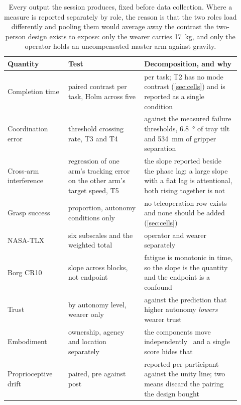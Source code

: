 \begin{table}[htbp]
  \centering
  \small
  \caption[The reporting plan]{Every output the session produces, fixed
  before data collection. Where a measure is reported separately by role,
  the reason is that the two roles load differently and pooling them would
  average away the contrast the two-person design exists to expose: only the
  wearer carries \SI{17}{\kilo\gram}, and only the operator holds an
  uncompensated master arm against gravity.}
  \label{tab:reporting-plan}
  \begin{tabular}{@{}p{0.24\linewidth}p{0.30\linewidth}p{0.38\linewidth}@{}}
    \toprule
    Quantity & Test & Decomposition, and why \\
    \midrule
    Completion time
      & paired contrast per task, Holm across five
      & per task; T2 has no mode contrast (\cref{sec:cells}) and is reported
        as a single condition \\
    Coordination error
      & threshold crossing rate, T3 and T4
      & against the measured failure thresholds, \SI{6.8}{\degree} of tray
        tilt and \SI{534}{\milli\metre} of gripper separation \\
    Cross-arm interference
      & regression of one arm's tracking error on the other arm's target
        speed, T5
      & the slope reported beside the phase lag: a large slope with a flat
        lag is attentional, both rising together is not \\
    Grasp success
      & proportion, autonomy conditions only
      & no teleoperation row exists and none should be added
        (\cref{sec:cells}) \\
    NASA-TLX~\cite{hart1988nasatlx}
      & six subscales and the weighted total
      & operator and wearer separately \\
    Borg CR10~\cite{borg1982perceived}
      & slope across blocks, not endpoint
      & fatigue is monotonic in time, so the slope is the quantity and the
        endpoint is a confound \\
    Trust
      & by autonomy level, wearer only
      & against the prediction that higher autonomy \emph{lowers} wearer
        trust~\cite{zhou2026proxemics} \\
    Embodiment
      & ownership, agency and location separately
      & the components move independently~\cite{longo2008embodiment} and a
        single score hides that \\
    Proprioceptive drift
      & paired, pre against post
      & reported per participant against the unity line; two means discard
        the pairing the design bought \\
    \bottomrule
  \end{tabular}
\end{table}

